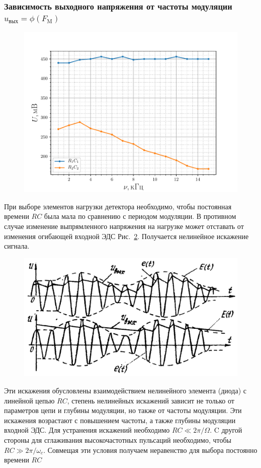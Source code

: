 \subsubsection{Зависимость выходного напряжения от частоты модуляции  $u_{\text{вых}} = \phi(F_{\text{M}})$}
\begin{figure}
	\centering
	\includegraphics[width=0.8\linewidth]{fig/exp3b.pdf}
	\caption{}
	\label{exp:3.3}
\end{figure}
При выборе элементов нагрузки детектора необходимо, чтобы постоянная времени $RC$ была мала по сравнению с периодом модуляции. В противном случае изменение выпрямленного напряжения на нагрузке может отставать от изменения огибающей входной ЭДС Рис.~\ref{pic:11}. Получается нелинейное искажение сигнала. 
\begin{figure}[h!]
	\centering
	\includegraphics[width=0.8\linewidth]{picture/pic11.jpg}
	\caption{}
	\label{pic:11}
\end{figure}
Эти искажения обусловлены взаимодействием нелинейного элемента (диода) с линейной цепью $RC$, степень нелинейных искажений зависит не только от параметров цепи и глубины модуляции, но также от частоты модуляции. Эти искажения возрастают с повышением частоты, а также глубины модуляции входной ЭДС. Для устранения искажений необходимо $RC\ll2\pi/\Omega$. C другой стороны для сглаживания высокочастотных пульсаций необходимо, чтобы $RC\gg2\pi/\omega_c$. Совмещая эти условия получаем неравенство для выбора постоянно времени $RC$
